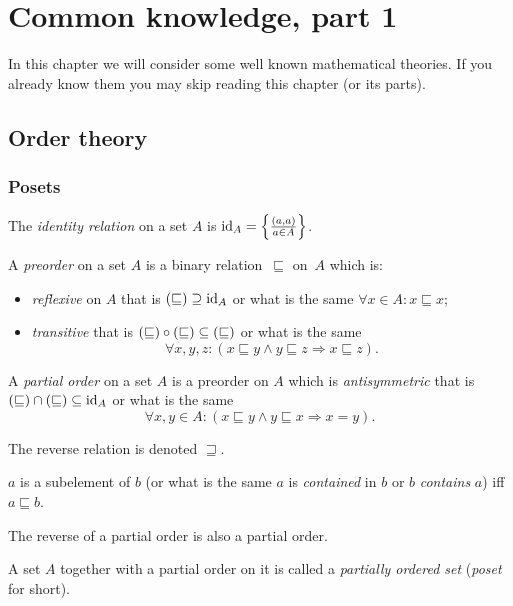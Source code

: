 
\chapter{\label{chap-common}Common knowledge, part 1}

In this chapter we will consider some well known mathematical theories.
If you already know them you may skip reading this chapter (or its
parts).


\section{Order theory}


\subsection{Posets}
\begin{defn}
The \emph{identity relation} on a set $A$
is $\operatorname{id}_{A}=\left\{ \frac{(a,a)}{a\in A}\right\}$.
\end{defn}

\begin{defn}
A \emph{preorder} on a set $A$ is a binary relation~$\sqsubseteq$ on~$A$ which is:
\begin{itemize}
\item \emph{reflexive} on $A$ that is $\left(\mathord{\sqsubseteq}\right)\supseteq\operatorname{id}_{A}$ or what is the same $\forall x\in A:x\sqsubseteq x$;
\item \emph{transitive} that is $\left(\mathord{\sqsubseteq}\right)\circ\left(\mathord{\sqsubseteq}\right)\subseteq\left(\mathord{\sqsubseteq}\right)$
 or what is the same \[ \forall x,y,z:(x\sqsubseteq y\land y\sqsubseteq z\Rightarrow x\sqsubseteq z). \]
\end{itemize}
\end{defn}

\begin{defn}
A \emph{partial order} on a set $A$ is a preorder
on $A$ which is \emph{antisymmetric} that is $\left(\mathord{\sqsubseteq}\right)\cap\left(\mathord{\sqsubseteq}\right)\subseteq\operatorname{id}_A$
or what is the same \[ \forall x,y\in A:(x\sqsubseteq y\land y\sqsubseteq x\Rightarrow x=y). \]
\end{defn}
The reverse relation is denoted $\sqsupseteq$.

\begin{defn}
$a$ is a subelement of $b$ (or what is the same
$a$ is \emph{contained} in $b$ or $b$ \emph{contains} $a$) iff
$a\sqsubseteq b$.\end{defn}
\begin{obvious}
The reverse of a partial order is also a partial order.\end{obvious}
\begin{defn}
A set $A$ together with
a partial order on it is called a \emph{partially ordered set} (\emph{poset}
for short).
\end{defn}

